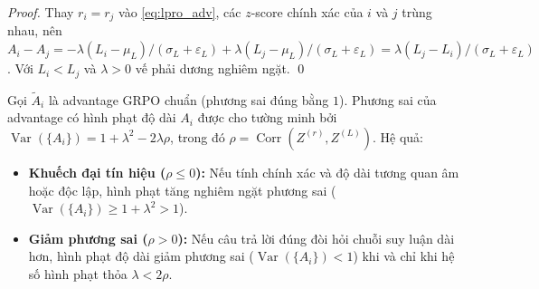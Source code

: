 \documentclass[11pt,a4paper]{article}
\begin{document}
\begin{proof}
Thay \(r_i=r_j\) vào \eqref{eq:lpro_adv}, các \(z\)-score chính xác của
\(i\) và \(j\) trùng nhau, nên
\(A_i - A_j = -\lambda(L_i-\mu_L)/(\sigma_L+\varepsilon_L)
            + \lambda(L_j-\mu_L)/(\sigma_L+\varepsilon_L)
            = \lambda(L_j - L_i)/(\sigma_L+\varepsilon_L)\). Với \(L_i<L_j\) và
\(\lambda>0\) vế phải dương nghiêm ngặt. \qed
\end{proof}

\begin{lemma}\label{lem:var_dynamics}
Gọi $\tilde A_i$ là advantage GRPO chuẩn (phương sai đúng bằng $1$). Phương sai của advantage có hình phạt độ dài $A_i$ được cho tường minh bởi $\operatorname{Var}(\{A_i\}) = 1 + \lambda^2 - 2\lambda\rho$, trong đó $\rho = \operatorname{Corr}(Z^{(r)}, Z^{(L)})$. Hệ quả:
\begin{itemize}
    \item \textbf{Khuếch đại tín hiệu ($\rho \le 0$):} Nếu tính chính xác và độ dài tương quan âm hoặc độc lập, hình phạt tăng nghiêm ngặt phương sai ($\operatorname{Var}(\{A_i\}) \ge 1 + \lambda^2 > 1$).
    \item \textbf{Giảm phương sai ($\rho > 0$):} Nếu câu trả lời đúng đòi hỏi chuỗi suy luận dài hơn, hình phạt độ dài giảm phương sai ($\operatorname{Var}(\{A_i\}) < 1$) khi và chỉ khi hệ số hình phạt thỏa $\lambda < 2\rho$.
\end{itemize}
\end{lemma}
\end{document}
